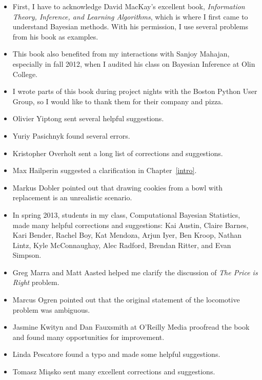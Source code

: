 \documentclass[12pt]{book}
\begin{document}
\small

\begin{itemize}

\item First, I have to acknowledge David MacKay's excellent book,
  {\it Information Theory, Inference, and Learning Algorithms}, which is
  where I first came to understand Bayesian methods.  With his
  permission, I use several problems from
  his book as examples.

\item This book also benefited from my interactions with Sanjoy
  Mahajan, especially in fall 2012, when I audited his class on
  Bayesian Inference at Olin College.

\item I wrote parts of this book during project nights with the Boston
  Python User Group, so I would like to thank them for their
  company and pizza.

\item Olivier Yiptong sent several helpful suggestions.

\item Yuriy Pasichnyk found several errors.

\item Kristopher Overholt sent a long list of corrections and suggestions.

\item Max Hailperin suggested a clarification in Chapter~\ref{intro}.

\item Markus Dobler pointed out that drawing cookies from a bowl
with replacement is an unrealistic scenario.

\item In spring 2013, students in my class, Computational Bayesian
  Statistics, made many helpful corrections and suggestions: Kai
  Austin, Claire Barnes, Kari Bender, Rachel Boy, Kat Mendoza, Arjun
  Iyer, Ben Kroop, Nathan Lintz, Kyle McConnaughay, Alec Radford,
  Brendan Ritter, and Evan Simpson.

\item Greg Marra and Matt Aasted helped me clarify the discussion of
  {\it The Price is Right} problem.

\item Marcus Ogren pointed out that the original statement of the
  locomotive problem was ambiguous.

\item Jasmine Kwityn and Dan Fauxsmith at O'Reilly Media proofread the
  book and found many opportunities for improvement.

\item Linda Pescatore found a typo and made some helpful suggestions.

\item Tomasz Mi\k{a}sko sent many excellent corrections and suggestions.


\end{itemize}
\end{document}
